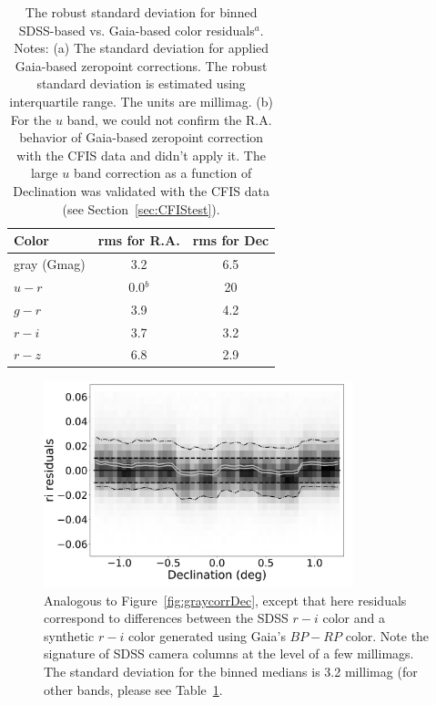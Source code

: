 \documentclass[fleqn,usenatbib]{mnras}
\begin{document}
\begin{table}
	\centering

	\begin{tabular}{l|c|c} %
		\hline
		Color & rms for R.A. & rms for Dec \\
		\hline
 gray (Gmag) &    3.2         &    6.5   \\
    $u-r$        &   0.0$^b$  &   20    \\     
    $g-r$        &   3.9         &    4.2    \\
    $r-i$         &   3.7         &    3.2    \\ 
    $r-z$        &   6.8         &    2.9    \\ 
		\hline
	\end{tabular}
		\caption{The robust standard deviation for binned SDSS-based vs. Gaia-based color residuals$^a$. Notes: (a) The standard deviation for applied Gaia-based zeropoint corrections. The robust standard deviation is estimated using interquartile range. The units are millimag. (b) For the $u$ band, we could not confirm the R.A. behavior of Gaia-based zeropoint correction with the CFIS data and didn't apply it. The large $u$ band correction as a function of Declination was validated with the CFIS data (see Section~\ref{sec:CFIStest}).}
	\label{tab:GaiaRMS}
\end{table}

 

\begin{figure}[th!]
    \centering\includegraphics[width=9cm]{figures/colorResidGaiaColorsB_ri_Dec_Hess.png} 
\caption{Analogous to Figure~\ref{fig:graycorrDec}, except that here residuals 
correspond to differences between the SDSS $r-i$ color and a synthetic $r-i$ color
generated using Gaia's $BP-RP$ color. Note the signature of SDSS camera columns
at the level of a few millimags. The standard deviation for the binned medians is 
3.2 millimag (for other bands, please see Table~\ref{tab:GaiaRMS}.}
\label{fig:riresid}
\end{figure}
\end{document}
